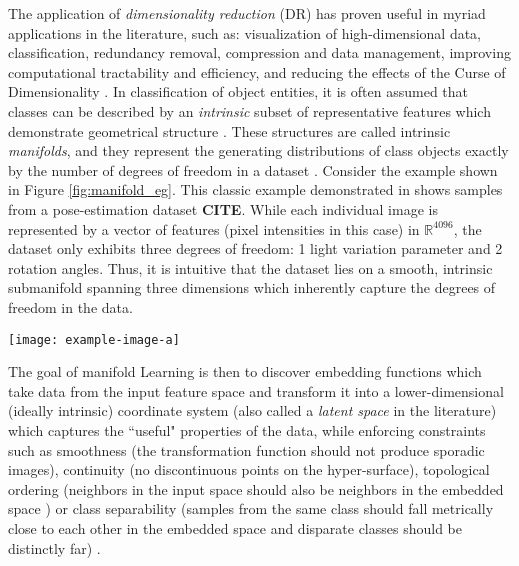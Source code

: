 The application of \textit{dimensionality reduction} (DR) has proven useful in myriad applications in the literature, such as: visualization of high-dimensional data, classification, redundancy removal, compression and data management, improving computational tractability and efficiency, and reducing the effects of the Curse of Dimensionality \cite{Bishop1998GTM,Nickel2017PoincareEmbeddings,Talmon2015ManifoldLearningInDynamicalSystems,Tenenbaum2000Isomap, Geng2005SupNonlinearDimRed, Palomo2017GHNG, Kohonen1990SOM,Kegl2008PrincipalManifoldsTextbook,Bengio2014RepLearningReview}.  In classification of object entities, it is often assumed that classes can be described by an \textit{intrinsic} subset of representative features which demonstrate geometrical structure \cite{Belkin2006ManReg}. These structures are called intrinsic \textit{manifolds}, and they represent the generating distributions of class objects exactly by the number of degrees of freedom in a dataset \cite{Thorstensen2009ManifoldThesis, Belkin2004SemiSupLearningRiemannianManifolds}.     Consider the example shown in Figure \ref{fig:manifold_eg}.  This classic example demonstrated in \cite{Thorstensen2009ManifoldThesis} shows samples from a pose-estimation dataset \textbf{CITE}.  While each individual image is represented by a vector of features (pixel intensities in this case) in $\mathbb{R}^{4096}$, the dataset only exhibits three degrees of freedom: 1 light variation parameter and 2 rotation angles.  Thus, it is intuitive that the dataset lies on a smooth, intrinsic submanifold spanning three dimensions which inherently capture the degrees of freedom in the data.

\begin{center}
	\begin{figure*}[h]
		\centering
		\texttt{[image: example-image-a]}
		\caption[Example pose data manifold.]{Placeholder for example of high D data lying on a low-dimensional sub-manifold.}
		\label{fig:manifold_eg}
	\end{figure*}
\end{center}

The goal of manifold Learning is then to discover embedding functions which take data from the input feature space and transform it into a lower-dimensional (ideally intrinsic) coordinate system (also called a \textit{latent space} in the literature) which captures the ``useful" properties of the data, while enforcing constraints such as smoothness (the transformation function should not produce sporadic images), continuity (no discontinuous points on the hyper-surface), topological ordering (neighbors in the input space should also be neighbors in the embedded space ) or class separability (samples from the same class should fall metrically close to each other in the embedded space and disparate classes should be distinctly far) \cite{Vural2018StudySupervisedManifoldLearning}.

